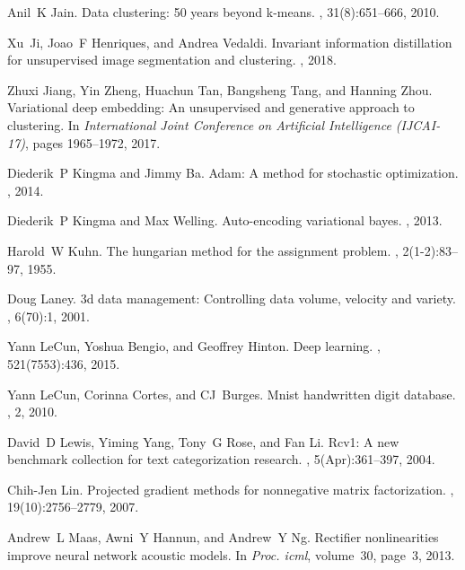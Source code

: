 \documentclass{article}
\begin{document}
\begin{thebibliography}{10}
Anil~K Jain.
\newblock Data clustering: 50 years beyond k-means.
, 31(8):651--666, 2010.

Xu~Ji, Joao~F Henriques, and Andrea Vedaldi.
\newblock Invariant information distillation for unsupervised image
  segmentation and clustering.
, 2018.

Zhuxi Jiang, Yin Zheng, Huachun Tan, Bangsheng Tang, and Hanning Zhou.
\newblock Variational deep embedding: An unsupervised and generative approach
  to clustering.
\newblock In {\em International Joint Conference on Artificial Intelligence
  (IJCAI-17)}, pages 1965--1972, 2017.

Diederik~P Kingma and Jimmy Ba.
\newblock Adam: A method for stochastic optimization.
, 2014.

Diederik~P Kingma and Max Welling.
\newblock Auto-encoding variational bayes.
, 2013.

Harold~W Kuhn.
\newblock The hungarian method for the assignment problem.
, 2(1-2):83--97, 1955.

Doug Laney.
\newblock 3d data management: Controlling data volume, velocity and variety.
, 6(70):1, 2001.

Yann LeCun, Yoshua Bengio, and Geoffrey Hinton.
\newblock Deep learning.
, 521(7553):436, 2015.

Yann LeCun, Corinna Cortes, and CJ~Burges.
\newblock Mnist handwritten digit database.
, 2, 2010.

David~D Lewis, Yiming Yang, Tony~G Rose, and Fan Li.
\newblock Rcv1: A new benchmark collection for text categorization research.
, 5(Apr):361--397, 2004.

Chih-Jen Lin.
\newblock Projected gradient methods for nonnegative matrix factorization.
, 19(10):2756--2779, 2007.

Andrew~L Maas, Awni~Y Hannun, and Andrew~Y Ng.
\newblock Rectifier nonlinearities improve neural network acoustic models.
\newblock In {\em Proc. icml}, volume~30, page~3, 2013.


\end{thebibliography}
\end{document}
